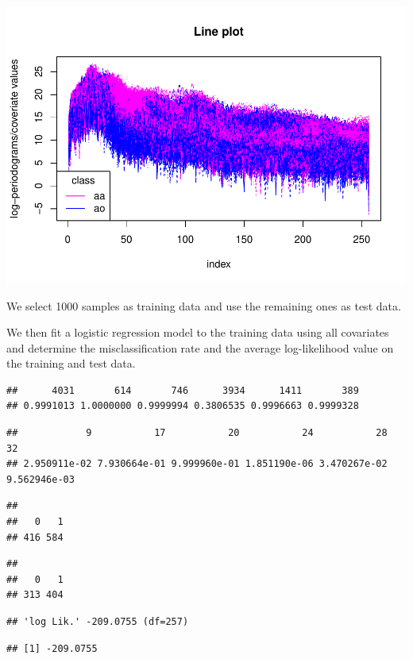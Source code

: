 \documentclass[
]{article}
\begin{document}
\includegraphics{A2_files/figure-latex/unnamed-chunk-11-1.pdf}

We select 1000 samples as training data and use the remaining ones as
test data.

We then fit a logistic regression model to the training data using all
covariates and determine the misclassification rate and the average
log-likelihood value on the training and test data.

\begin{verbatim}
##      4031       614       746      3934      1411       389 
## 0.9991013 1.0000000 0.9999994 0.3806535 0.9996663 0.9999328
\end{verbatim}

\begin{verbatim}
##            9           17           20           24           28           32 
## 2.950911e-02 7.930664e-01 9.999960e-01 1.851190e-06 3.470267e-02 9.562946e-03
\end{verbatim}

\begin{verbatim}
## 
##   0   1 
## 416 584
\end{verbatim}

\begin{verbatim}
## 
##   0   1 
## 313 404
\end{verbatim}

\begin{verbatim}
## 'log Lik.' -209.0755 (df=257)
\end{verbatim}

\begin{verbatim}
## [1] -209.0755
\end{verbatim}
\end{document}
